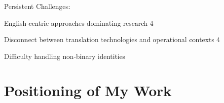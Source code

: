Persistent Challenges:

English-centric approaches dominating research 4

Disconnect between translation technologies and operational contexts 4

Difficulty handling non-binary identities

\section{Positioning of My Work}    
    
